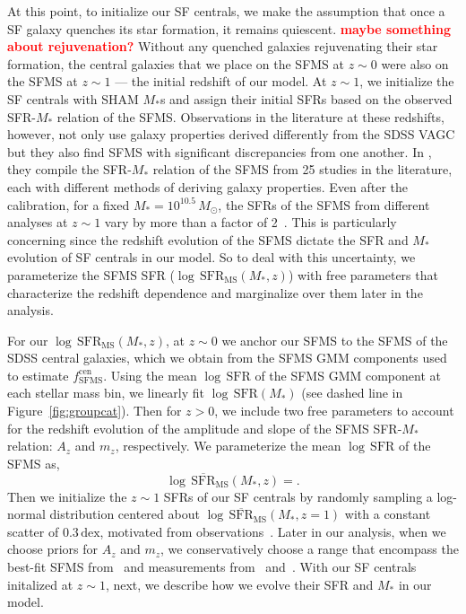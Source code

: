 \documentclass[12pt, letterpaper, preprint]{aastex}
\newcommand{\todo}[1]{{\bf \textcolor{red}{#1}}}
\newcommand{\beq}{\begin{equation}}
\newcommand{\eeq}{\end{equation}}
\begin{document}
At this point, to initialize our SF centrals,  we make the assumption 
that once a SF galaxy quenches its star formation, it remains quiescent. 
\todo{maybe something about rejuvenation?} 
Without any quenched galaxies rejuvenating their star formation, the central galaxies that 
we place on the SFMS at $z \sim 0$ were also on the SFMS at $z \sim 1$ --- 
the initial redshift of our model. At $z \sim 1$, we initialize the SF centrals
with SHAM $M_*$s and assign their initial SFRs based on the observed SFR-$M_*$ 
relation of the SFMS. Observations in the literature at these redshifts, 
however, not only use galaxy properties derived differently from the SDSS VAGC
but they also find SFMS with significant discrepancies from one another. 
In \cite{speagle2014}, they compile the SFR-$M_*$ relation of the SFMS 
from 25 studies in the literature, each with different methods of deriving 
galaxy properties. Even after the calibration, for a fixed $M_* = 10^{10.5}\, M_\odot$, 
the SFRs of the SFMS from different analyses at $z \sim 1$ vary by more than a factor of 
2~\citep[see Figure 2 of][]{speagle2014}. This is particularly concerning 
since the redshift evolution of the SFMS dictate the SFR and $M_*$ evolution 
of SF centrals in our model. So to deal with this uncertainty, we parameterize 
the SFMS SFR ($\log\,\mathrm{SFR}_\mathrm{MS}(M_*, z)$) with free parameters 
that characterize the redshift dependence and marginalize over them later in 
the analysis. 

For our $\log\,\mathrm{SFR}_\mathrm{MS}(M_*, z)$, at $z \sim 0$ we anchor our 
SFMS to the SFMS of the SDSS central galaxies, which we obtain from the 
SFMS GMM components used to estimate $f^\mathrm{cen}_\mathrm{SFMS}$. Using 
the mean $\log\, \mathrm{SFR}$ of the SFMS GMM component at each stellar 
mass bin, we linearly fit $\log\, \mathrm{SFR}(M_*)$ (see dashed line in 
Figure~\ref{fig:groupcat}). Then for $z > 0$, we include two free 
parameters to account for the redshift evolution of the amplitude and 
slope of the SFMS SFR-$M_*$ relation: $A_z$ and $m_z$, respectively. 
We parameterize the mean $\log\,\mathrm{SFR}$ of the SFMS as, 
\beq \label{eq:logsfr_ms}
\log\,\overline{\mathrm{SFR}}_\mathrm{MS}(M_*, z) = . 
\eeq
Then we initialize the $z \sim 1$ SFRs of our SF centrals by randomly sampling 
a log-normal distribution centered about $\log\,\overline{\mathrm{SFR}}_\mathrm{MS}(M_*, z=1)$ 
with a constant scatter of $0.3\,\mathrm{dex}$, motivated from 
observations~\citep{noeske2007, elbaz2007, daddi2007, whitaker2012}. 
Later in our analysis, when we choose priors for $A_z$ and $m_z$, we conservatively 
choose a range that encompass the best-fit SFMS from~\cite{speagle2014} and measurements from~\cite{moustakas2013} 
and~\cite{lee2015}. With our SF centrals initalized at $z \sim 1$, next, we 
describe how we evolve their SFR and $M_*$ in our model.
\end{document}
